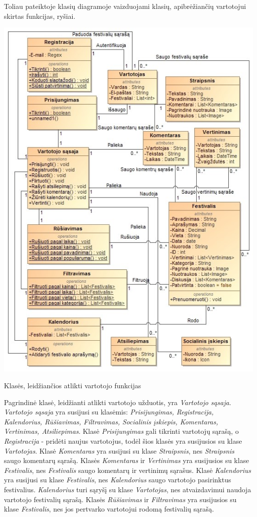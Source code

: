 ﻿\documentclass{VUMIFPSkursinis}
\begin{document}
Toliau pateiktoje klasių diagramoje vaizduojami klasių, apibrėžiančių vartotojui skirtas funkcijas, ryšiai.
\begin{center}
    \includegraphics[scale=0.5]{img/PSI3/user}
	\label{uml:21}
	\caption{Klasės, leidžiančios atlikti vartotojo funkcijas}
\end{center}
Pagrindinė klasė, leidžianti atlikti vartotojo užduotis, yra \textit{Vartotojo sąsaja}. \textit{Vartotojo sąsaja} yra susijusi su klasėmis: \textit{Prisijungimas, Registracija, Kalendorius, Rūšiavimas, Filtravimas, Socialinis įskiepis, Komentaras, Vertinimas, Atsiliepimas}. Klasė \textit{Prisijungimas} gali tikrinti vartotojų sąrašą, o \textit{Registracija} - pridėti naujus vartotojus, todėl šios klasės yra susijusios su klase \textit{Vartotojas}. Klasė \textit{Komentaras} yra susijusi su klase \textit{Straipsnis}, nes \textit{Straipsnis} saugo komentarų sąrašą. Klasės \textit{Komentaras} ir \textit{Vertinimas} yra susijusios su klase \textit{Festivalis}, nes \textit{Festivalis} saugo komentarų ir vertinimų sąrašus. Klasė \textit{Kalendorius} yra susijusi su klase \textit{Festivalis}, nes \textit{Kalendorius} saugo vartotojo pasirinktus festivalius. \textit{Kalendorius} turi sąryšį su klase \textit{Vartotojas}, nes atvaizdavimui naudoja vartotojo festivalių sąrašą. Klasės \textit{Rūšiavimas} ir \textit{Filtravimas} yra susijusios su klase \textit{Festivalis}, nes jos pertvarko vartotojui rodomą festivalių sąrašą.
\end{document}
